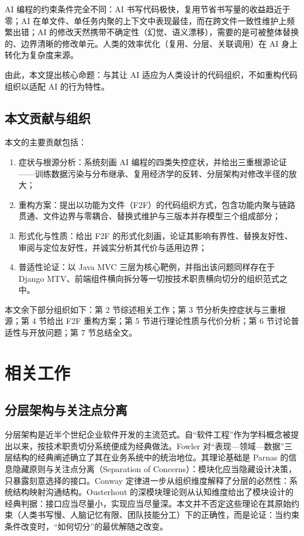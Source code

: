 \documentclass[11pt,a4paper]{ctexart}
\begin{document}
AI 编程的约束条件完全不同：AI 书写代码极快，复用节省书写量的收益趋近于零；AI 在单文件、单任务内聚的上下文中表现最佳，而在跨文件一致性维护上频繁出错；AI 的修改天然携带不确定性（幻觉、语义漂移），需要的是可被整体替换的、边界清晰的修改单元。人类的效率优化（复用、分层、关联调用）在 AI 身上转化为复杂度来源。

由此，本文提出核心命题：与其让 AI 适应为人类设计的代码组织，不如重构代码组织以适配 AI 的行为特性。

\subsection{本文贡献与组织}
本文的主要贡献包括：

\begin{enumerate}
\item 症状与根源分析：系统刻画 AI 编程的四类失控症状，并给出三重根源论证——训练数据污染与分布继承、复用经济学的反转、分层架构对修改半径的放大；
\item 重构方案：提出以功能为文件（F2F）的代码组织方式，包含功能内聚与链路贯通、文件边界与零耦合、替换式维护与三版本并存模型三个组成部分；
\item 形式化与性质：给出 F2F 的形式化刻画，论证其影响有界性、替换友好性、审阅与定位友好性，并诚实分析其代价与适用边界；
\item 普适性论证：以 Java MVC 三层为核心靶例，并指出该问题同样存在于 Django MTV、前端组件横向拆分等一切按技术职责横向切分的组织范式之中。
\end{enumerate}

本文余下部分组织如下：第 2 节综述相关工作；第 3 节分析失控症状与三重根源；第 4 节给出 F2F 重构方案；第 5 节进行理论性质与代价分析；第 6 节讨论普适性与开放问题；第 7 节总结全文。

\section{相关工作}
\subsection{分层架构与关注点分离}
分层架构是近半个世纪企业软件开发的主流范式。自“软件工程”作为学科概念被提出以来\cite{ref14}，按技术职责切分系统便成为经典做法。Fowler 对“表现—领域—数据”三层结构的经典阐述确立了其在业务系统中的统治地位\cite{ref3}。其理论基础是 Parnas 的信息隐藏原则\cite{ref4}与关注点分离（Separation of Concerns）：模块化应当隐藏设计决策，只暴露刻意选择的接口。Conway 定律进一步从组织维度解释了分层的必然性：系统结构映射沟通结构\cite{ref5}。Ousterhout 的深模块理论则从认知维度给出了模块设计的经典判据：接口应当尽量小，实现应当尽量深\cite{ref6}。本文并不否定这些理论在其原始约束（人类书写慢、人脑记忆有限、团队技能分工）下的正确性，而是论证：当约束条件改变时，“如何切分”的最优解随之改变。
\end{document}
